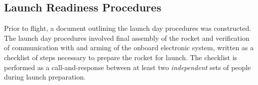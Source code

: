 \subsection{Launch Readiness Procedures} %
\label{sub:launch_readiness_procedures}
Prior to flight, a document outlining the launch day procedures was constructed. The launch day procedures involved final assembly of the rocket and verification of communication with and arming of the onboard electronic system, written as a checklist of steps necessary to prepare the rocket for launch. The checklist is performed as a call-and-response between at least two \textit{independent} sets of people during launch preparation. 